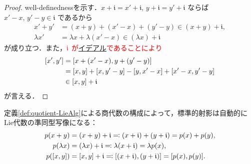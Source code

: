 \documentclass[rep_main]{subfiles}
\begin{document}
\begin{proof}
    well-definednessを示す．$x + \mathfrak{i} = x' + \mathfrak{i},\, y + \mathfrak{i} = y' + \mathfrak{i}$ ならば $x'-x,\, y' - y \in \mathfrak{i}$ であるから
    \begin{align}
        x' + y' &= (x + y) + (x' - x) + (y' - y) \in (x + y) + \mathfrak{i}, \\
        \lambda x' &= \lambda x + \lambda (x' - x) \in (\lambda x) + \mathfrak{i}
    \end{align}
    が成り立つ．また，$\textcolor{red}{\mathfrak{i}}$ \textcolor{red}{が}\hyperref[def:ideal-LieAlg]{イデアル}\textcolor{red}{であることにより}
    \begin{align}
        \comm{x'}{y'} &= \comm{x + (x' - x)}{y + (y' - y)} \\
        &= \comm{x}{y} + \comm{x}{y' - y} - \comm{y}{x' - x} + \comm{x'-x}{y'-y} \\
        &\in \comm{x}{y} + \mathfrak{i}
    \end{align}
    が言える．
\end{proof}

\begin{marker}
    定義\ref{def:quotient-LieAlg}による商代数の構成によって，標準的射影は自動的にLie代数の準同型写像になる：
    \begin{align}
        p (x + y) &= (x + y) + \mathfrak{i} \eqqcolon (x + \mathfrak{i}) + (y + \mathfrak{i}) = p(x) + p(y), \\
        p (\lambda x) &= (\lambda x) + \mathfrak{i} \eqqcolon\lambda(x + \mathfrak{i}) = \lambda p(x), \\
        p (\comm{x}{y}) &= \comm{x}{y} + \mathfrak{i} \eqqcolon \comm{(x + \mathfrak{i})}{(y + \mathfrak{i})} = \comm{p(x)}{p(y)}.
    \end{align}
\end{marker}
\end{document}
